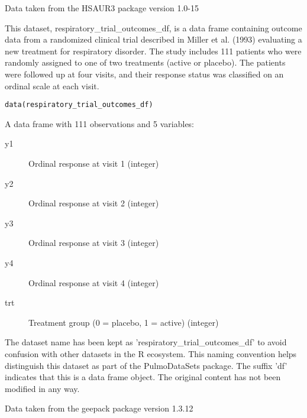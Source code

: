 \documentclass[a4paper]{book}
\begin{document}
%
\begin{Source}
Data taken from the HSAUR3 package version 1.0-15
\end{Source}
%
\begin{Description}
This dataset, respiratory\_trial\_outcomes\_df, is a data frame containing outcome data
from a randomized clinical trial described in Miller et al. (1993) evaluating a new
treatment for respiratory disorder. The study includes 111 patients who were randomly assigned
to one of two treatments (active or placebo). The patients were followed up at four visits,
and their response status was classified on an ordinal scale at each visit.
\end{Description}
%
\begin{Usage}
\begin{verbatim}
data(respiratory_trial_outcomes_df)
\end{verbatim}
\end{Usage}
%
\begin{Format}
A data frame with 111 observations and 5 variables:
\begin{description}

\item[y1] Ordinal response at visit 1 (integer)
\item[y2] Ordinal response at visit 2 (integer)
\item[y3] Ordinal response at visit 3 (integer)
\item[y4] Ordinal response at visit 4 (integer)
\item[trt] Treatment group (0 = placebo, 1 = active) (integer)

\end{description}

\end{Format}
%
\begin{Details}
The dataset name has been kept as 'respiratory\_trial\_outcomes\_df' to avoid confusion
with other datasets in the R ecosystem. This naming convention helps distinguish
this dataset as part of the PulmoDataSets package. The suffix 'df' indicates
that this is a data frame object. The original content has not been modified
in any way.
\end{Details}
%
\begin{Source}
Data taken from the geepack package version 1.3.12
\end{Source}
\end{document}
